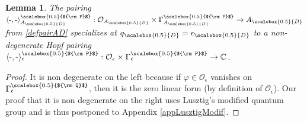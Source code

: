 \documentclass[11pt]{amsart}
\newtheorem{lem}[teo]{Lemma}
\newcommand{\e}{\epsilon}
\newcommand{\Oo}{\mathcal{O}}
\newcommand{\qD}{q_{\scalebox{0.5}{D}}}
\newcommand{\eD}{\epsilon_{\scalebox{0.5}{D}}}
\newcommand{\AD}{A_{\scalebox{0.5}{D}}}
\newcommand{\Q}{{\scalebox{0.5}{${\rm Q}$}}}
\newcommand{\D}{{\scalebox{0.5}{D}}}
\newcommand{\Pup}{{\scalebox{0.5}{${\rm P}$}}}
\begin{document}
\begin{lem}\label{nondegpairepsD}
The pairing $\langle \text{-},\text{-} \rangle_{\AD}^\Pup:{\mathcal O}_{\AD}\times \Gamma_{\AD}^\Pup\to A_\D$ from \eqref{defpairAD} specializes at $\qD = \eD$ to a non-degenerate Hopf pairing $\langle \text{-},\text{-} \rangle_{\e}^\Pup:{\mathcal O}_\epsilon\times \Gamma_\epsilon^\Pup\to {\mathbb C}$.
\end{lem}
\begin{proof}
It is non degenerate on the left because if $\varphi\in {\mathcal O}_\epsilon$ vanishes on $\Gamma_\epsilon^\Q$, then it is the zero linear form (by definition of $\Oo_\e$). Our proof that it is non degenerate on the right uses Lusztig's modified quantum group and is thus postponed to Appendix \ref{appLusztigModif}.
\end{proof}
\end{document}
